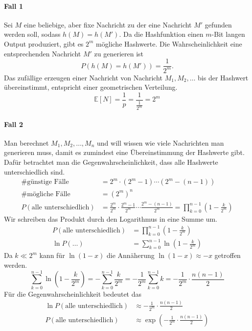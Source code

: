 \paragraph{Fall 1} Sei $M$ eine beliebige, aber fixe Nachricht zu der eine
Nachricht $M'$ gefunden werden soll, sodass $h(M) = h(M')$. 
Da die Hashfunktion einen $m$-Bit langen Output produziert, gibt es $2^m$ mögliche 
Hashwerte. Die Wahrscheinlichkeit eine entsprechenden Nachricht $M'$ zu generieren ist
\[
P(h(M) = h(M')) = \frac{1}{2^m}.
\]
Das zufällige erzeugen einer Nachricht von Nachricht $M_1,M_2,\dots$
bis der Hashwert übereinstimmt, entspricht einer geometrischen Verteilung.
\[
    \mathbb{E}[N]=\frac{1}{p}=\frac{1}{\frac{1}{2^m}}=2^m
\]
\paragraph{Fall 2} Man berechnet $M_1,M_2,\dots,M_n$ und will wissen wie viele Nachrichten 
man generieren muss, damit es zumindest eine Übereinstimmung der Hashwerte gibt.
Dafür betrachtet man die Gegenwahrscheinlichkeit, dass alle Hashwerte unterschiedlich sind.
\begin{align*}
    \text{\# günstige Fälle} &= 2^m \cdot (2^m - 1) \cdots (2^m - (n - 1))\\
    \text{\# mögliche Fälle} &= (2^m)^n\\
    P(\text{alle unterschiedlich}) &= \frac{2^m}{2^m}\cdot \frac{2^m - 1}{2^m} \cdots \frac{2^m - (n-1)}{2^m}
    =\prod_{k = 0}^{n-1} \left( 1 - \frac{k}{2^m}\right)
\end{align*}
Wir schreiben das Produkt durch den Logarithmus in eine Summe um.
\begin{align*}
    P(\text{alle unterschiedlich}) &= \prod_{k = 0}^{n-1} \left( 1 - \frac{k}{2^m}\right)\\
    \ln P(\dots) &= \sum_{k=0}^{n-1}\ln\left(1-\frac{k}{2^m}\right)
\end{align*}
Da $k \ll 2^m$ kann für $\ln(1-x)$ die Annäherung $\ln(1-x) \approx -x$ getroffen werden.
\[
    \sum_{k=0}^{n-1}\ln\left(1-\frac{k}{2^m}\right) = -\sum_{k=0}^{n-1}\frac{k}{2^m}
    =-\frac{1}{2^m}\sum_{k=0}^{n-1}k=-\frac{1}{2^m}\cdot\frac{n(n-1)}{2}
\]
Für die Gegenwahrscheinlichkeit bedeutet das
\begin{align*}
    \ln P(\text{alle unterschiedlich}) &\approx -\frac{1}{2^m}\cdot\frac{n(n-1)}{2}\\
    P(\text{alle unterschiedlich}) &\approx \exp \left(-\frac{1}{2^m}\cdot\frac{n(n-1)}{2}\right)
\end{align*}
